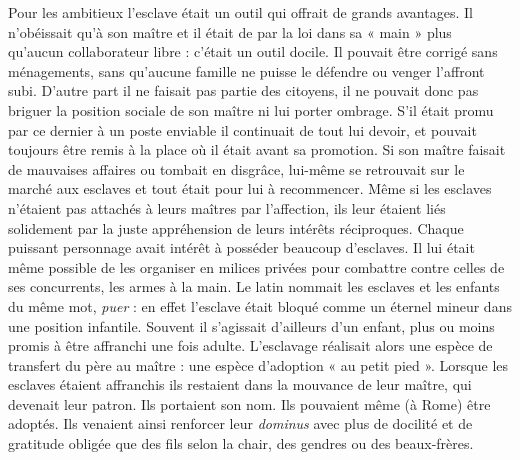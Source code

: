 Pour les ambitieux l'esclave était un outil qui offrait de grands
avantages. Il n'obéissait qu'à son maître et il était de par la loi dans sa «
main » plus qu'aucun collaborateur libre : c'était un outil docile. Il pouvait
être corrigé sans ménagements, sans qu'aucune famille ne puisse le
défendre ou venger l'affront subi. D'autre part il ne faisait pas partie des
citoyens, il ne pouvait donc pas briguer la position sociale de son maître
ni lui porter ombrage. S'il était promu par ce dernier à un poste enviable
il continuait de tout lui devoir, et pouvait toujours être remis à la place
où il était avant sa promotion. Si son maître faisait de mauvaises affaires
ou tombait en disgrâce, lui-même se retrouvait sur le marché aux esclaves
et tout était pour lui à recommencer. Même si les esclaves n'étaient
pas attachés à leurs maîtres par l'affection, ils leur étaient liés solidement
par la juste appréhension de leurs intérêts réciproques. Chaque puissant
personnage avait intérêt à posséder beaucoup d'esclaves. Il lui était même
possible de les organiser en milices privées pour combattre contre celles
de ses concurrents, les armes à la main. Le latin nommait les esclaves et
les enfants du même mot, \emph{puer} : en effet l'esclave était bloqué comme un
éternel mineur dans une position infantile. Souvent il s'agissait d'ailleurs
d'un enfant, plus ou moins promis à être affranchi une fois adulte. L'esclavage
réalisait alors une espèce de transfert du père au maître : une espèce
d'adoption « au petit pied ». Lorsque les esclaves étaient affranchis
ils restaient dans la mouvance de leur maître, qui devenait leur patron. Ils
portaient son nom. Ils pouvaient même (à Rome) être adoptés. Ils venaient
ainsi renforcer leur \emph{dominus} avec plus de docilité et de gratitude
obligée que des fils selon la chair, des gendres ou des beaux-frères.

